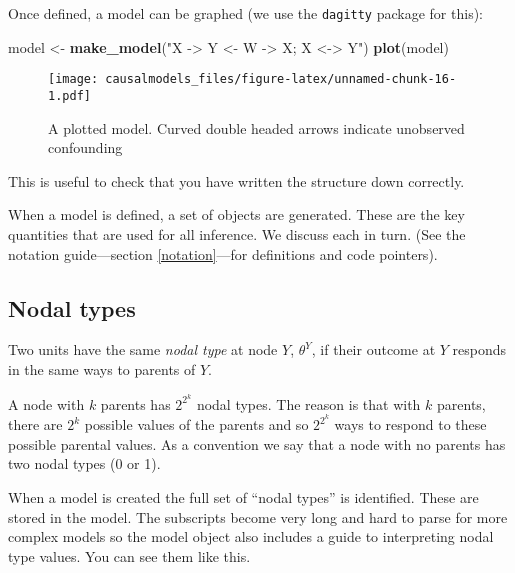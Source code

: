 \documentclass[
  12pt,
]{book}
\newenvironment{Shaded}{\begin{snugshade}}{\end{snugshade}}
\newcommand{\FunctionTok}[1]{\textcolor[rgb]{0.13,0.29,0.53}{\textbf{#1}}}
\newcommand{\NormalTok}[1]{#1}
\newcommand{\OtherTok}[1]{\textcolor[rgb]{0.56,0.35,0.01}{#1}}
\newcommand{\SpecialCharTok}[1]{\textcolor[rgb]{0.81,0.36,0.00}{\textbf{#1}}}
\newcommand{\StringTok}[1]{\textcolor[rgb]{0.31,0.60,0.02}{#1}}
\begin{document}
Once defined, a model can be graphed (we use the \texttt{dagitty} package for this):

\begin{Shaded}
\begin{Highlighting}[]
\NormalTok{model }\OtherTok{\textless{}{-}} \FunctionTok{make\_model}\NormalTok{(}\StringTok{"X {-}\textgreater{} Y \textless{}{-} W {-}\textgreater{} X; X \textless{}{-}\textgreater{} Y"}\NormalTok{)}
\FunctionTok{plot}\NormalTok{(model)}
\end{Highlighting}
\end{Shaded}

\begin{figure}
\centering
\texttt{[image: causalmodels\_files/figure-latex/unnamed-chunk-16-1.pdf]}
\caption{\label{fig:unnamed-chunk-16}A plotted model. Curved double headed arrows indicate unobserved confounding}
\end{figure}

This is useful to check that you have written the structure down correctly.

When a model is defined, a set of objects are generated. These are the key quantities that are used for all inference. We discuss each in turn. (See the notation guide---section \ref{notation}---for definitions and code pointers).

\hypertarget{nodal-types}{%
\subsection{Nodal types}\label{nodal-types}}

Two units have the same \emph{nodal type} at node \(Y\), \(\theta^Y\), if their outcome at \(Y\) responds in the same ways to parents of \(Y\).

A node with \(k\) parents has \(2^{2^k}\) nodal types. The reason is that with \(k\) parents, there are \(2^k\) possible values of the parents and so \(2^{2^k}\) ways to respond to these possible parental values. As a convention we say that a node with no parents has two nodal types (0 or 1).

When a model is created the full set of ``nodal types'' is identified. These are stored in the model. The subscripts become very long and hard to parse for more complex models so the model object also includes a guide to interpreting nodal type values. You can see them like this.

\begin{Shaded}
\end{Shaded}
\end{document}

